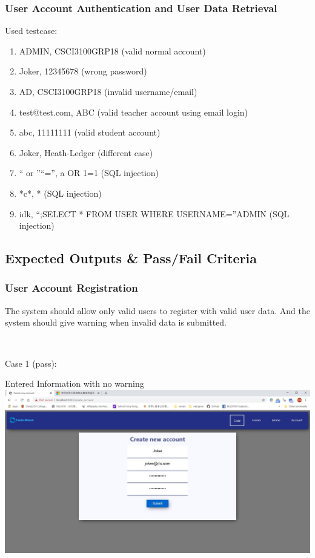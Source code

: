 \subsubsection{User Account Authentication and User Data Retrieval}
Used testcase:
\begin{enumerate}
  \item ADMIN, CSCI3100GRP18 (valid normal account)
  \item Joker, 12345678 (wrong password)
  \item AD, CSCI3100GRP18 (invalid username/email)
  \item test@test.com, ABC (valid teacher account using email login)
  \item abc, 11111111 (valid student account)
  \item Joker, Heath-Ledger (different case)
  \item `` or ''``='', a OR 1=1 (SQL injection)
  \item *c*, * (SQL injection)
  \item idk, ``;SELECT * FROM USER WHERE USERNAME=''ADMIN (SQL injection)
\end{enumerate}

\subsection{Expected Outputs \& Pass/Fail Criteria}
\subsubsection{User Account Registration}
The system should allow only valid users to register with valid user data.
And the system should give warning when invalid data is submitted.

~

Case 1 (pass):

Entered Information with no warning\\
\includegraphics[scale=0.45]{Doc/Pics/case-5-1-1}


